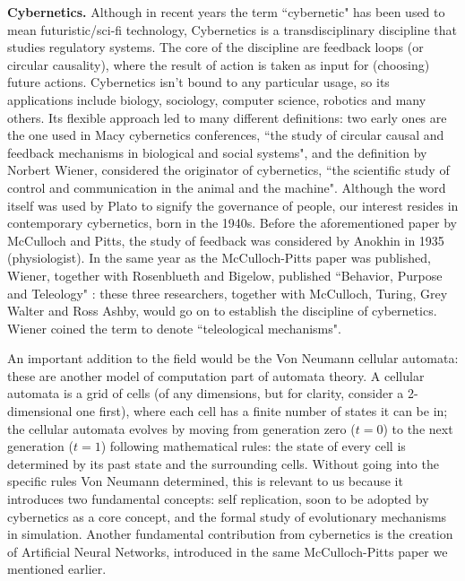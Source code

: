 \documentclass[../main.tex]{subfiles}
\begin{document}
\vspace{4pt}
\textbf{Cybernetics.} Although in recent years the term ``cybernetic" has been used to mean futuristic/sci-fi technology, Cybernetics is a transdisciplinary discipline that studies regulatory systems. The core of the discipline are feedback loops (or circular causality), where the result of action is taken as input for (choosing) future actions. Cybernetics isn't bound to any particular usage, so its applications include biology, sociology, computer science, robotics and many others. Its flexible approach led to many different definitions: two early ones are the one used in Macy cybernetics conferences, ``the study of circular causal and feedback mechanisms in biological and social systems"\cite{steerCyberneticsCircularCausal1952}, and the definition by Norbert Wiener, considered the originator of cybernetics, ``the scientific study of control and communication in the animal and the machine"\cite{wienerCyberneticsControlCommunication1961}. Although the word itself was used by Plato to signify the governance of people, our interest resides in contemporary cybernetics, born in the 1940s. Before the aforementioned paper by McCulloch and Pitts, the study of feedback was considered by Anokhin in 1935 \cite{anokhinProblemsCentrePeriphery1935} (physiologist). In the same year as the McCulloch-Pitts paper was published, Wiener, together with Rosenblueth and Bigelow, published ``Behavior, Purpose and Teleology" \cite{rosenbluethBehaviorPurposeTeleology1943}: these three researchers, together with McCulloch, Turing, Grey Walter and Ross Ashby, would go on to establish the discipline of cybernetics. Wiener coined the term to denote ``teleological mechanisms".

An important addition to the field would be the Von Neumann cellular automata: these are another model of computation part of automata theory. A cellular automata is a grid of cells (of any dimensions, but for clarity, consider a 2-dimensional one first), where each cell has a finite number of states it can be in; the cellular automata evolves by moving from generation zero ($t=0$) to the next generation ($t=1$) following mathematical rules: the state of every cell is determined by its past state and the surrounding cells. Without going into the specific rules Von Neumann determined, this is relevant to us because it introduces two fundamental concepts: self replication, soon to be adopted by cybernetics as a core concept, and the formal study of evolutionary mechanisms in simulation. Another fundamental contribution from cybernetics is the creation of Artificial Neural Networks, introduced in the same McCulloch-Pitts paper we mentioned earlier.
\end{document}
